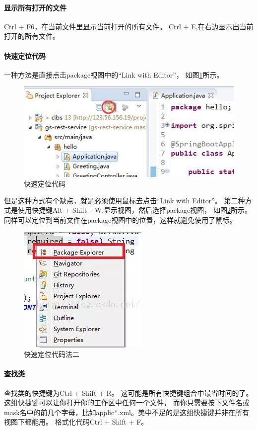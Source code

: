 \documentclass{book}
\begin{document}
\paragraph{显示所有打开的文件}
Ctrl + F6，在当前文件里显示当前打开的所有文件。
Ctrl + E,在右边显示出当前打开的所有文件。

\paragraph{快速定位代码}
一种方法是直接点击package视图中的“Link with Editor”，
如图\ref{code:EclipseLinkEditor}所示。

\begin{figure}[htbp]
	\centering
	\includegraphics[scale=0.6]{EclipseLinkEditor.jpg}
	\caption{快速定位代码}
	\label{code:EclipseLinkEditor}
\end{figure}

但是这种方式有个缺点，就是必须使用鼠标去点击“Link with Editor”。
第二种方式是使用快捷键Alt + Shift +W,显示视图，然后选择package视图，
如图\ref{code:LocateSourceCode}所示。
同样可以定位到当前文件在package视图中的位置，这样就避免使用了鼠标。

\begin{figure}[htbp]
	\centering
	\includegraphics[scale=0.6]{LocateSourceCode.jpg}
	\caption{快速定位代码法二}
	\label{code:LocateSourceCode}
\end{figure}

\paragraph{查找类}
查找类的快捷键为Ctrl + Shift + R。
这可能是所有快捷键组合中最省时间的了。这组快捷键可以让你打开你的工作区中任何一个文件，
而你只需要按下文件名或mask名中的前几个字母，比如applic*.xml。美中不足的是这组快捷键并非在所有视图下都能用。
格式化代码Ctrl + Shift + F。
\end{document}
